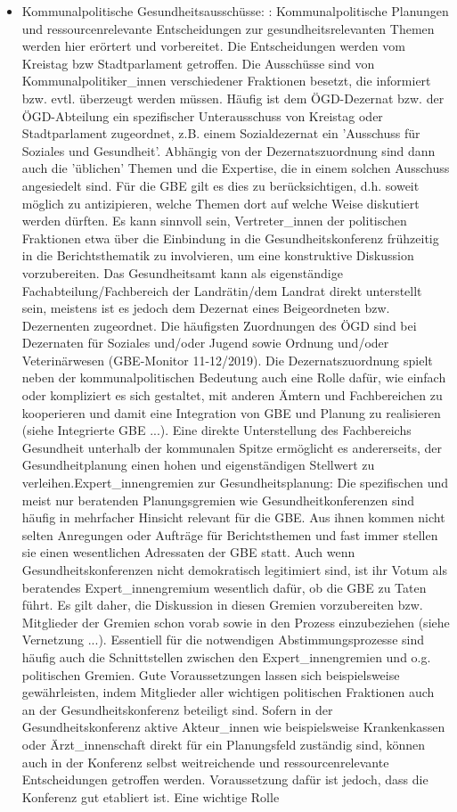 \documentclass{article}
\begin{document}
\begin{itemize}
\item Kommunalpolitische Gesundheitsausschüsse: : Kommunalpolitische Planungen und ressourcenrelevante Entscheidungen zur gesundheitsrelevanten Themen werden hier erörtert und vorbereitet. Die Entscheidungen werden vom Kreistag bzw Stadtparlament getroffen. Die Ausschüsse sind von Kommunalpolitiker\_innen verschiedener Fraktionen besetzt, die informiert bzw. evtl. überzeugt werden müssen. Häufig ist dem ÖGD-Dezernat bzw. der ÖGD-Abteilung ein spezifischer Unterausschuss von Kreistag oder Stadtparlament zugeordnet, z.B. einem Sozialdezernat ein 'Ausschuss für Soziales und Gesundheit'. Abhängig von der Dezernatszuordnung sind dann auch die 'üblichen' Themen und die Expertise, die in einem solchen Ausschuss angesiedelt sind. Für die GBE gilt es dies zu berücksichtigen, d.h. soweit möglich zu antizipieren, welche Themen dort auf welche Weise diskutiert werden dürften. Es kann sinnvoll sein, Vertreter\_innen der politischen Fraktionen etwa über die Einbindung in die Gesundheitskonferenz frühzeitig in die Berichtsthematik zu involvieren, um eine konstruktive Diskussion vorzubereiten. Das Gesundheitsamt kann als eigenständige  Fachabteilung/Fachbereich der Landrätin/dem Landrat direkt unterstellt sein, meistens ist es jedoch dem Dezernat eines Beigeordneten bzw. Dezernenten zugeordnet. Die häufigsten Zuordnungen des ÖGD sind bei Dezernaten für Soziales und/oder Jugend sowie Ordnung und/oder Veterinärwesen (GBE-Monitor 11-12/2019). Die Dezernatszuordnung spielt neben der kommunalpolitischen Bedeutung auch eine Rolle dafür, wie einfach oder kompliziert es sich gestaltet, mit anderen Ämtern und Fachbereichen zu kooperieren und damit eine Integration von GBE und Planung zu realisieren (siehe Integrierte GBE ...). Eine direkte Unterstellung des Fachbereichs Gesundheit unterhalb der kommunalen Spitze ermöglicht es andererseits, der Gesundheitplanung einen hohen und eigenständigen Stellwert zu verleihen.Expert\_innengremien zur Gesundheitsplanung: Die spezifischen und meist nur beratenden Planungsgremien wie Gesundheitkonferenzen sind häufig in mehrfacher Hinsicht relevant für die GBE. Aus ihnen kommen nicht selten Anregungen oder Aufträge für Berichtsthemen und fast immer stellen sie einen wesentlichen Adressaten der GBE statt. Auch wenn Gesundheitskonferenzen nicht demokratisch legitimiert sind, ist ihr Votum als beratendes Expert\_innengremium wesentlich dafür, ob die GBE zu Taten führt. Es gilt daher, die Diskussion in diesen Gremien vorzubereiten bzw. Mitglieder der Gremien schon vorab sowie in den Prozess einzubeziehen (siehe Vernetzung ...). Essentiell für die notwendigen Abstimmungsprozesse sind häufig auch die Schnittstellen zwischen den Expert\_innengremien und o.g. politischen Gremien. Gute Voraussetzungen lassen sich beispielsweise gewährleisten, indem Mitglieder aller wichtigen politischen Fraktionen auch an der Gesundheitskonferenz beteiligt sind. Sofern in der Gesundheitskonferenz aktive Akteur\_innen wie beispielsweise Krankenkassen oder Ärzt\_innenschaft direkt für ein Planungsfeld zuständig sind, können auch in der Konferenz selbst weitreichende und ressourcenrelevante Entscheidungen getroffen werden. Voraussetzung dafür ist jedoch, dass die Konferenz gut etabliert ist. Eine wichtige Rolle 
\end{itemize}
\end{document}
